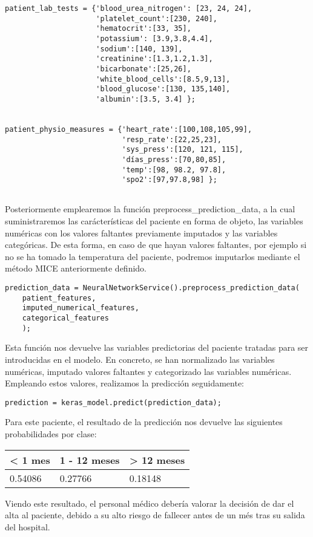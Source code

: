 \documentclass{report}
\begin{document}
\begin{verbatim}
patient_lab_tests = {'blood_urea_nitrogen': [23, 24, 24],
                     'platelet_count':[230, 240],
                     'hematocrit':[33, 35],
                     'potassium': [3.9,3.8,4.4],
                     'sodium':[140, 139],
                     'creatinine':[1.3,1.2,1.3],
                     'bicarbonate':[25,26],
                     'white_blood_cells':[8.5,9,13],
                     'blood_glucose':[130, 135,140],
                     'albumin':[3.5, 3.4] };
                    

patient_physio_measures = {'heart_rate':[100,108,105,99],
                           'resp_rate':[22,25,23],
                           'sys_press':[120, 121, 115],
                           'días_press':[70,80,85],
                           'temp':[98, 98.2, 97.8],
                           'spo2':[97,97.8,98] };
              
\end{verbatim}
Posteriormente emplearemos la función preprocess\_prediction\_data, a la cual suministraremos las carácterísticas del paciente en forma de objeto, las variables numéricas con los valores faltantes previamente imputados y las variables categóricas. De esta forma, en caso de que hayan valores faltantes, por ejemplo si no se ha tomado la temperatura del paciente, podremos imputarlos mediante el método MICE anteriormente definido.

\begin{verbatim}
prediction_data = NeuralNetworkService().preprocess_prediction_data(
    patient_features,
    imputed_numerical_features,
    categorical_features
	);
\end{verbatim}
Esta función nos devuelve las variables predictorias del paciente tratadas para ser introducidas en el modelo. En concreto, se han normalizado las variables numéricas, imputado valores faltantes y categorizado las variables numéricas. Empleando estos valores, realizamos la predicción seguidamente:

\begin{verbatim}
prediction = keras_model.predict(prediction_data);
\end{verbatim}

Para este paciente, el resultado de la predicción nos devuelve las siguientes probabilidades por clase: 

\begin{longtable}[]{@{}lll@{}}
\toprule
\textless{} 1 mes & 1 - 12 meses & \textgreater{} 12
meses\tabularnewline
\midrule
\endhead
0.54086 & 0.27766 & 0.18148\tabularnewline
\bottomrule
\end{longtable}
Viendo este resultado, el personal médico debería valorar la decisión de dar el alta al paciente, debido a su alto riesgo de fallecer antes de un més tras su salida del hospital.
\newpage
\end{document}
